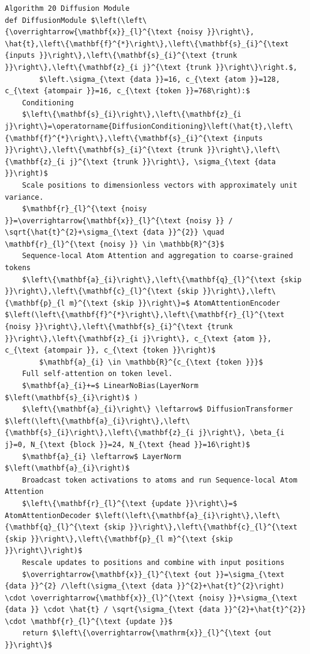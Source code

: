 \documentclass[10pt]{article}
\begin{document}
\begin{verbatim}
Algorithm 20 Diffusion Module
def DiffusionModule $\left(\left\{\overrightarrow{\mathbf{x}}_{l}^{\text {noisy }}\right\}, \hat{t},\left\{\mathbf{f}^{*}\right\},\left\{\mathbf{s}_{i}^{\text {inputs }}\right\},\left\{\mathbf{s}_{i}^{\text {trunk }}\right\},\left\{\mathbf{z}_{i j}^{\text {trunk }}\right\}\right.$,
        $\left.\sigma_{\text {data }}=16, c_{\text {atom }}=128, c_{\text {atompair }}=16, c_{\text {token }}=768\right):$
    Conditioning
    $\left\{\mathbf{s}_{i}\right\},\left\{\mathbf{z}_{i j}\right\}=\operatorname{DiffusionConditioning}\left(\hat{t},\left\{\mathbf{f}^{*}\right\},\left\{\mathbf{s}_{i}^{\text {inputs }}\right\},\left\{\mathbf{s}_{i}^{\text {trunk }}\right\},\left\{\mathbf{z}_{i j}^{\text {trunk }}\right\}, \sigma_{\text {data }}\right)$
    Scale positions to dimensionless vectors with approximately unit variance.
    $\mathbf{r}_{l}^{\text {noisy }}=\overrightarrow{\mathbf{x}}_{l}^{\text {noisy }} / \sqrt{\hat{t}^{2}+\sigma_{\text {data }}^{2}} \quad \mathbf{r}_{l}^{\text {noisy }} \in \mathbb{R}^{3}$
    Sequence-local Atom Attention and aggregation to coarse-grained tokens
    $\left\{\mathbf{a}_{i}\right\},\left\{\mathbf{q}_{l}^{\text {skip }}\right\},\left\{\mathbf{c}_{l}^{\text {skip }}\right\},\left\{\mathbf{p}_{l m}^{\text {skip }}\right\}=$ AtomAttentionEncoder $\left(\left\{\mathbf{f}^{*}\right\},\left\{\mathbf{r}_{l}^{\text {noisy }}\right\},\left\{\mathbf{s}_{i}^{\text {trunk }}\right\},\left\{\mathbf{z}_{i j}\right\}, c_{\text {atom }}, c_{\text {atompair }}, c_{\text {token }}\right)$
        $\mathbf{a}_{i} \in \mathbb{R}^{c_{\text {token }}}$
    Full self-attention on token level.
    $\mathbf{a}_{i}+=$ LinearNoBias(LayerNorm $\left(\mathbf{s}_{i}\right)$ )
    $\left\{\mathbf{a}_{i}\right\} \leftarrow$ DiffusionTransformer $\left(\left\{\mathbf{a}_{i}\right\},\left\{\mathbf{s}_{i}\right\},\left\{\mathbf{z}_{i j}\right\}, \beta_{i j}=0, N_{\text {block }}=24, N_{\text {head }}=16\right)$
    $\mathbf{a}_{i} \leftarrow$ LayerNorm $\left(\mathbf{a}_{i}\right)$
    Broadcast token activations to atoms and run Sequence-local Atom Attention
    $\left\{\mathbf{r}_{l}^{\text {update }}\right\}=$ AtomAttentionDecoder $\left(\left\{\mathbf{a}_{i}\right\},\left\{\mathbf{q}_{l}^{\text {skip }}\right\},\left\{\mathbf{c}_{l}^{\text {skip }}\right\},\left\{\mathbf{p}_{l m}^{\text {skip }}\right\}\right)$
    Rescale updates to positions and combine with input positions
    $\overrightarrow{\mathbf{x}}_{l}^{\text {out }}=\sigma_{\text {data }}^{2} /\left(\sigma_{\text {data }}^{2}+\hat{t}^{2}\right) \cdot \overrightarrow{\mathbf{x}}_{l}^{\text {noisy }}+\sigma_{\text {data }} \cdot \hat{t} / \sqrt{\sigma_{\text {data }}^{2}+\hat{t}^{2}} \cdot \mathbf{r}_{l}^{\text {update }}$
    return $\left\{\overrightarrow{\mathrm{x}}_{l}^{\text {out }}\right\}$
\end{verbatim}
\end{document}
